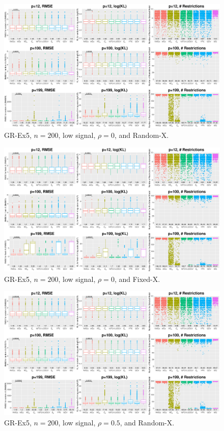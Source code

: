 \clearpage
\begin{figure}[!ht]
\centering
\includegraphics[width=\textwidth]{figures/supplement/randomx_GR-Ex5_n200_lsnr_rho0.eps}
\caption{GR-Ex5, $n=200$, low signal, $\rho=0$, and Random-X.}
\end{figure}
\begin{figure}[!ht]
\centering
\includegraphics[width=\textwidth]{figures/supplement/fixedx_GR-Ex5_n200_lsnr_rho0.eps}
\caption{GR-Ex5, $n=200$, low signal, $\rho=0$, and Fixed-X.}
\end{figure}
\clearpage
\begin{figure}[!ht]
\centering
\includegraphics[width=\textwidth]{figures/supplement/randomx_GR-Ex5_n200_lsnr_rho05.eps}
\caption{GR-Ex5, $n=200$, low signal, $\rho=0.5$, and Random-X.}
\end{figure}
